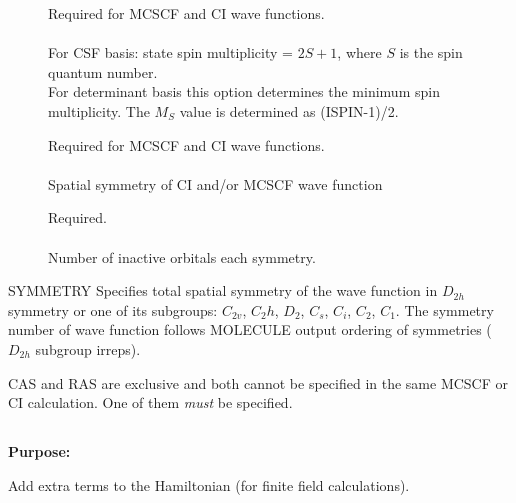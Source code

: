 \begin{description}
\item[]
  Required for MCSCF and CI wave
  functions.\\
  \\
  For CSF basis: state spin multiplicity = $2S + 1$,
  where $S$ is the spin quantum number. \\
  For determinant basis this option determines the minimum spin
  multiplicity.  The $M_S$ value is determined as (ISPIN-1)/2.

\item[]
  Required for MCSCF and CI wave functions.\\
   \\
  Spatial symmetry of CI and/or MCSCF wave function

\item[]
  Required.\\
   \\
  Number of inactive orbitals each symmetry.

\end{description}


\noindent SYMMETRY   Specifies total spatial symmetry of the wave
function in $D_{2h}$ symmetry or one of its subgroups: $C_{2v}$, $C_2h$,
$D_2$, $C_s$, $C_i$, $C_2$, $C_1$. The  symmetry number of wave
function follows MOLECULE output ordering of symmetries ($D_{2h}$
subgroup irreps).

\noindent
CAS and RAS are exclusive and
both cannot be specified in the same
MCSCF or CI
calculation. One of them {\em must} be specified.


\pagebreak[3]
\subsection{\label{ref-haminp}}

{\bf Purpose:}

Add extra terms to the Hamiltonian (for finite field calculations).

